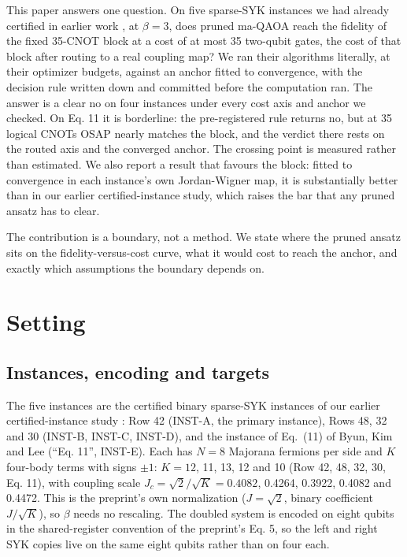 \documentclass[11pt]{article}
\begin{document}
This paper answers one question. On five sparse-SYK instances we had already certified in earlier work \cite{dongo2026instances}, at $\beta = 3$, does pruned ma-QAOA reach the fidelity of the fixed 35-CNOT block at a cost of at most 35 two-qubit gates, the cost of that block after routing to a real coupling map? We ran their algorithms literally, at their optimizer budgets, against an anchor fitted to convergence, with the decision rule written down and committed before the computation ran. The answer is a clear no on four instances under every cost axis and anchor we checked. On Eq. 11 it is borderline: the pre-registered rule returns no, but at 35 logical CNOTs OSAP nearly matches the block, and the verdict there rests on the routed axis and the converged anchor. The crossing point is measured rather than estimated. We also report a result that favours the block: fitted to convergence in each instance's own Jordan-Wigner map, it is substantially better than in our earlier certified-instance study, which raises the bar that any pruned ansatz has to clear.

The contribution is a boundary, not a method. We state where the pruned ansatz sits on the fidelity-versus-cost curve, what it would cost to reach the anchor, and exactly which assumptions the boundary depends on.

\section{Setting}

\subsection{Instances, encoding and targets}

The five instances are the certified binary sparse-SYK instances of our earlier certified-instance study \cite{dongo2026instances}: Row 42 (INST-A, the primary instance), Rows 48, 32 and 30 (INST-B, INST-C, INST-D), and the instance of Eq.~(11) of Byun, Kim and Lee \cite{byun2026wormhole} (``Eq. 11'', INST-E). Each has $N = 8$ Majorana fermions per side and $K$ four-body terms with signs $\pm 1$: $K = 12$, 11, 13, 12 and 10 (Row 42, 48, 32, 30, Eq. 11), with coupling scale $J_c = \sqrt{2}/\sqrt{K} = 0.4082$, 0.4264, 0.3922, 0.4082 and 0.4472. This is the preprint's own normalization ($J = \sqrt{2}$, binary coefficient $J/\sqrt{K}$), so $\beta$ needs no rescaling. The doubled system is encoded on eight qubits in the shared-register convention of the preprint's Eq. 5, so the left and right SYK copies live on the same eight qubits rather than on four each.
\end{document}
